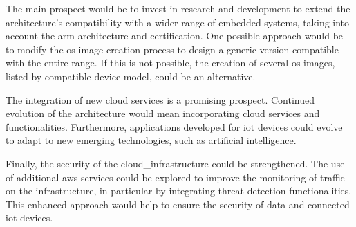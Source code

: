 The main prospect would be to invest in research and development to extend the architecture's compatibility with a wider range of embedded systems, taking into account the \gls{arm} architecture and  certification. One possible approach would be to modify the \acrshort{os} image creation process to design a generic version compatible with the entire range. If this is not possible, the creation of several \acrshort{os} images, listed by compatible device model, could be an alternative.

The integration of new \gls{cloud} services is a promising prospect. Continued evolution of the architecture would mean incorporating \gls{cloud} services and functionalities. Furthermore, applications developed for \acrshort{iot} devices could evolve to adapt to new emerging technologies, such as artificial intelligence.

Finally, the security of the \gls{cloud_infrastructure} could be strengthened. The use of additional \gls{aws} services could be explored to improve the monitoring of traffic on the infrastructure, in particular by integrating threat detection functionalities. This enhanced approach would help to ensure the security of data and connected \acrshort{iot} devices.